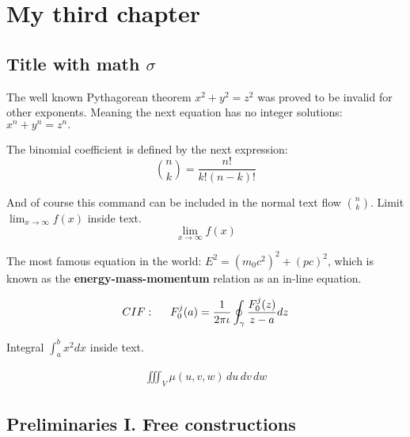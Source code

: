 

\chapter{My third chapter}  %

\ifpdf
    \graphicspath{{Chapter3/Figs/Raster/}{Chapter3/Figs/PDF/}{Chapter3/Figs/}}
\else
    \graphicspath{{Chapter3/Figs/Vector/}{Chapter3/Figs/}}
\fi


\section{Title with math \texorpdfstring{$\sigma$}{[sigma]}} %

The well known Pythagorean theorem \(x^2 + y^2 = z^2\) was
proved to be invalid for other exponents.
Meaning the next equation has no integer solutions:
$x^n + y^n = z^n.$

The binomial coefficient is defined by the next expression:
\[
    \binom{n}{k} = \frac{n!}{k!(n-k)!}
\]

And of course this command can be included in the normal
text flow \(\binom{n}{k}\). Limit $\lim_{x\to\infty} f(x)$ inside text.
$$\lim_{x\to\infty} f(x)$$

The most famous equation in the world: $E^2 = (m_0c^2)^2 + (pc)^2$, which is
known as the \textbf{energy-mass-momentum} relation as an in-line equation.

\begin{align}
CIF: \hspace*{5mm}F_0^j(a) = \frac{1}{2\pi \iota} \oint_{\gamma} \frac{F_0^j(z)}{z - a} dz
\end{align}

Integral $\int_{a}^{b} x^2 dx$ inside text.

\begin{align}
\iiint_V \mu(u,v,w) \,du\,dv\,dw
\end{align}


\section{Preliminaries I. Free constructions} %

